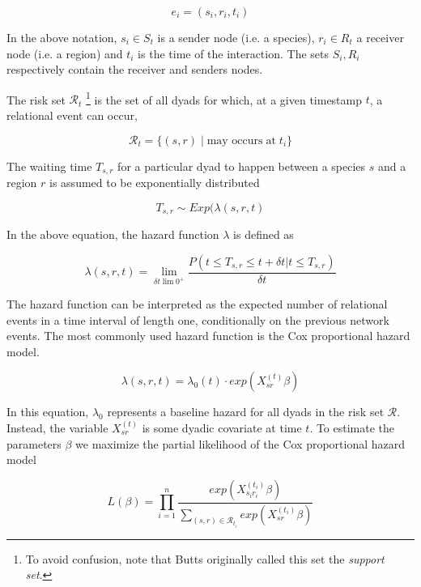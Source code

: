 \documentclass[mscthesis]{usiinfthesis}
\begin{document}
\[
e_i = (s_i, r_i, t_i)
\]

\noindent In the above notation, $s_i \in S_{t} $ is a sender node (i.e. a species), $r_i \in R_{t}$ a receiver node (i.e. a region) and $t_i$ is the time of the interaction. The sets $S_i, R_i$ respectively contain the receiver and senders nodes.

%

The risk set $\mathcal{R}_t$ \footnote{To avoid confusion, note that Butts originally called this set the \textit{support set}.} is the set of all dyads for which, at a given timestamp $t$, a relational event can occur,

\[
\mathcal{R}_{t} = \{(s,r) \; | \; \textrm{may occurs} \; \textrm{at} \; t_i\}
\]

The waiting time $T_{s,r}$ for a particular dyad to happen between a species $s$ and a region $r$ is assumed to be exponentially distributed 

\[
T_{s,r} \sim Exp(\lambda(s, r, t)
\]


In the above equation, the hazard function $\lambda$ is defined as

\[
\lambda(s, r, t) = \lim_{\delta t \lim 0^+} \frac{P(t \leq T_{s,r} \leq t + \delta t | t \leq T_{s,r})}{\delta t}
\]

The hazard function can be interpreted as the expected number of relational events in a time interval of length one, conditionally on the previous network events. The most commonly used hazard function is the Cox proportional hazard model. 


\[
\lambda(s, r, t) = \lambda_0(t) \cdot exp({X_{sr}^{(t)} \beta} )
\]

In this equation, $\lambda_0$ represents a baseline hazard for all dyads in the risk set $\mathcal{R}$. Instead, the variable $X_{sr}^{(t)}$ is some dyadic covariate at time $t$. To estimate the parameters $\beta$ we maximize the partial likelihood of the Cox proportional hazard model 

\[
L(\beta) =  \prod_{i=1}^n \frac{exp (X_{s_i r_i}^{(t_i)} \beta) }{ \sum_{(s,r) \in \mathcal{R}_{t_i}} exp({X_{sr}^{(t_i)} \beta} )}
\]
\end{document}
